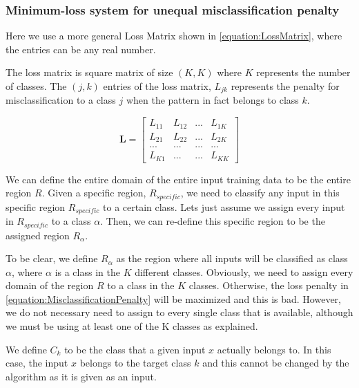 \documentclass[a4paper,12pt]{article}
\begin{document}
\clearpage
\subsubsection{Minimum-loss system for unequal misclassification penalty}
\label{section:MinimumLossGeneral}

Here we use a more general Loss Matrix shown in \ref{equation:LossMatrix}, where the entries can be any real number.  

The loss matrix is square matrix of size $(K,K)$ where $K$ represents the number of classes. 
The $(j,k)$ entries of the loss matrix, $L_{jk}$ represents the penalty for misclassification to a class $j$ when the pattern in fact belongs to class $k$. 

\begin{equation}
\label{equation:LossMatrix}
\mathbf{L} =
  \begin{bmatrix}
    L_{11} & L_{12} & ... & L_{1K} \\
    L_{21} & L_{22} & ... & L_{2K} \\
    ... & ... & ... & ... \\
    L_{K1} & ... & ... & L_{KK}
  \end{bmatrix}
\end{equation}

We can define the entire domain of the entire input training data to be the entire region $R$. 
Given a specific region, $R_{specific}$, we need to classify any input in this specific region $R_{specific}$ to a certain class. Lets just assume we assign every input in $R_{specific}$  to a class $\alpha$. Then, we can re-define this specific region to be the assigned region $R_{\alpha}$. 

To be clear, we define $R_{\alpha}$ as the region where all inputs will be classified as class $\alpha$, where $\alpha$ is a class in the $K$ different classes.
Obviously, we need to assign every domain of the region $R$ to a class in the $K$ classes. Otherwise, the loss penalty in \ref{equation:MisclassificationPenalty} will be maximized and this is bad. However, we do not necessary need to assign to every single class that is available, although we must be using at least one of the K classes as explained. 

We define $C_{k}$ to be the class that a given input $x$ actually belongs to. In this case, the input $x$ belongs to the target class $k$ and this cannot be changed by the algorithm as it is given as an input. 
\end{document}
